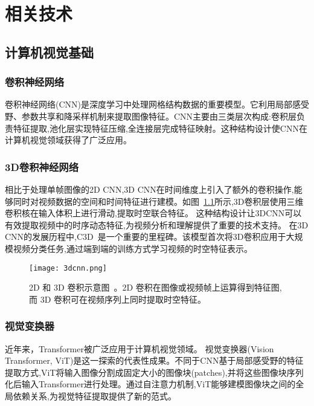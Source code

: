 

\chapter{相关技术}
\label{chap:background}

\section{计算机视觉基础} %

\subsection{卷积神经网络}
卷积神经网络(CNN)是深度学习中处理网格结构数据的重要模型。它利用局部感受野、参数共享和降采样机制来提取图像特征。CNN主要由三类层次构成:卷积层负责特征提取,池化层实现特征压缩,全连接层完成特征映射。这种结构设计使CNN在计算机视觉领域获得了广泛应用。

\subsection{3D卷积神经网络}
相比于处理单帧图像的2D CNN,3D CNN在时间维度上引入了额外的卷积操作,能够同时对视频数据的空间和时间特征进行建模。如图~\ref{fig:3dcnn}所示,3D卷积层使用三维卷积核在输入体积上进行滑动,提取时空联合特征。
这种结构设计让3DCNN可以有效提取视频中的时序动态特征,为视频分析和理解提供了重要的技术支持。
在3D CNN的发展历程中,C3D~\cite{tran2015c3d}是一个重要的里程碑。该模型首次将3D卷积应用于大规模视频分类任务,通过端到端的训练方式学习视频的时空特征表示。
\begin{figure}[htbp]
    \centering
    \texttt{[image: 3dcnn.png]}
    \caption{2D 和 3D 卷积示意图~\cite{tran2015c3d}。2D 卷积在图像或视频帧上运算得到特征图,而 3D 卷积可在视频序列上同时提取时空特征。}
    \label{fig:3dcnn}
\end{figure}

\subsection{视觉变换器}
近年来，Transformer被广泛应用于计算机视觉领域。
视觉变换器(Vision Transformer, ViT)是这一探索的代表性成果。不同于CNN基于局部感受野的特征提取方式,ViT将输入图像分割成固定大小的图像块(patches),并将这些图像块序列化后输入Transformer进行处理。通过自注意力机制,ViT能够建模图像块之间的全局依赖关系,为视觉特征提取提供了新的范式。

